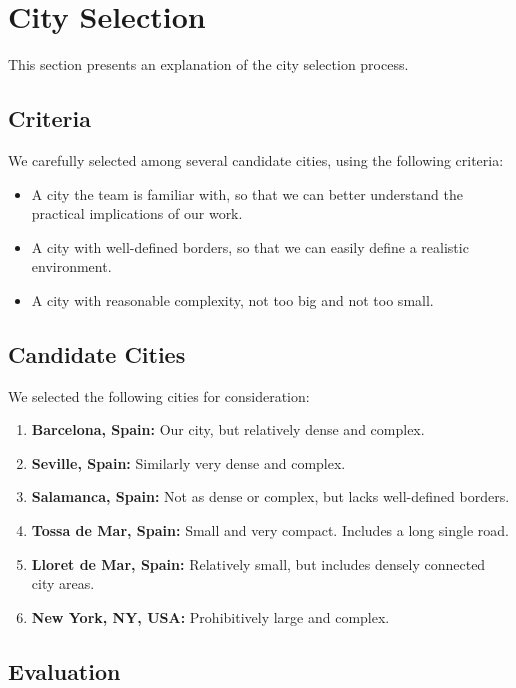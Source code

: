 \section{City Selection}
\label{sec:city-selection}

This section presents an explanation of the city selection process.

\subsection{Criteria}

We carefully selected among several candidate cities, using the following criteria:

\begin{itemize}
    \item A city the team is familiar with, so that we can better understand the practical implications of our work.
    \item A city with well-defined borders, so that we can easily define a realistic environment.
    \item A city with reasonable complexity, not too big and not too small.
\end{itemize}

\subsection{Candidate Cities}

We selected the following cities for consideration:
\begin{enumerate}
    \item \textbf{Barcelona, Spain:} Our city, but relatively dense and complex.
    \item \textbf{Seville, Spain:} Similarly very dense and complex.
    \item \textbf{Salamanca, Spain:} Not as dense or complex, but lacks well-defined borders.
    \item \textbf{Tossa de Mar, Spain:} Small and very compact. Includes a long single road.
    \item \textbf{Lloret de Mar, Spain:} Relatively small, but includes densely connected city areas.
    \item \textbf{New York, NY, USA:} Prohibitively large and complex.
\end{enumerate}

\subsection{Evaluation}

